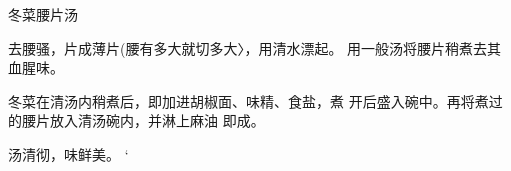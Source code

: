 \begin{recipe}{冬菜腰片汤}

\ingredients




\cooking

去腰骚，片成薄片(腰有多大就切多大〉，用清水漂起。 用一般汤将腰片稍煮去其血腥味。

冬菜在清汤内稍煮后，即加进胡椒面、味精、食盐，煮 开后盛入碗中。再将煮过的腰片放入清汤碗内，并淋上麻油 即成。

\notes

汤清彻，味鲜美。	‘

\end{recipe}

